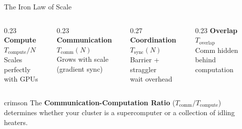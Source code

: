 \documentclass[aspectratio=169, 12pt]{beamer}
\newcommand{\CCR}{Communication-Computation Ratio}
\begin{document}
\begin{frame}{The Iron Law of Scale}
\vspace{0.1cm}
\begin{columns}[T]
  \begin{column}{0.23\textwidth}
    \centering
    \textcolor{computestroke}{\textbf{Compute}}\\[0.05cm]
    {\scriptsize $T_{\text{compute}}/N$\\Scales perfectly\\with GPUs}
  \end{column}
  \begin{column}{0.23\textwidth}
    \centering
    \textcolor{errorstroke}{\textbf{Communication}}\\[0.05cm]
    {\scriptsize $T_{\text{comm}}(N)$\\Grows with scale\\(gradient sync)}
  \end{column}
  \begin{column}{0.27\textwidth}
    \centering
    \textcolor{routingstroke}{\textbf{Coordination}}\\[0.05cm]
    {\scriptsize $T_{\text{sync}}(N)$\\Barrier + straggler\\wait overhead}
  \end{column}
  \begin{column}{0.23\textwidth}
    \centering
    \textcolor{datastroke}{\textbf{Overlap}}\\[0.05cm]
    {\scriptsize $T_{\text{overlap}}$\\Comm hidden behind\\computation}
  \end{column}
\end{columns}

\vspace{0.2cm}
\begin{mlsyscard}{crimson}
The \textbf{\CCR{}} ($T_{\text{comm}}/T_{\text{compute}}$) determines whether your cluster is a supercomputer or a collection of idling heaters.
\end{mlsyscard}

\end{frame}
\end{document}
